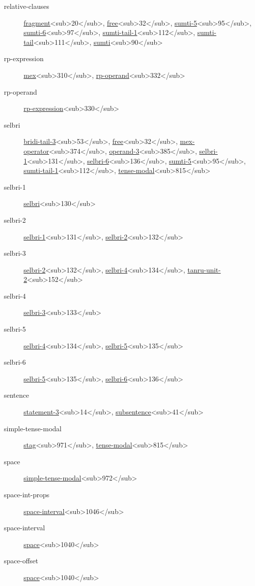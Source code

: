 \begin{description}
\item[relative-clauses] \hyperref[html:b20]{fragment}<sub>20</sub>, \hyperref[html:b32]{free}<sub>32</sub>, \hyperref[html:b95]{sumti-5}<sub>95</sub>, \hyperref[html:b97]{sumti-6}<sub>97</sub>, \hyperref[html:b112]{sumti-tail-1}<sub>112</sub>, \hyperref[html:b111]{sumti-tail}<sub>111</sub>, \hyperref[html:b90]{sumti}<sub>90</sub>
\item[rp-expression] \hyperref[html:b310]{mex}<sub>310</sub>, \hyperref[html:b332]{rp-operand}<sub>332</sub>
\item[rp-operand] \hyperref[html:b330]{rp-expression}<sub>330</sub>
\item[selbri] \hyperref[html:b53]{bridi-tail-3}<sub>53</sub>, \hyperref[html:b32]{free}<sub>32</sub>, \hyperref[html:b374]{mex-operator}<sub>374</sub>, \hyperref[html:b385]{operand-3}<sub>385</sub>, \hyperref[html:b131]{selbri-1}<sub>131</sub>, \hyperref[html:b136]{selbri-6}<sub>136</sub>, \hyperref[html:b95]{sumti-5}<sub>95</sub>, \hyperref[html:b112]{sumti-tail-1}<sub>112</sub>, \hyperref[html:b815]{tense-modal}<sub>815</sub>
\item[selbri-1] \hyperref[html:b130]{selbri}<sub>130</sub>
\item[selbri-2] \hyperref[html:b131]{selbri-1}<sub>131</sub>, \hyperref[html:b132]{selbri-2}<sub>132</sub>
\item[selbri-3] \hyperref[html:b132]{selbri-2}<sub>132</sub>, \hyperref[html:b134]{selbri-4}<sub>134</sub>, \hyperref[html:b152]{tanru-unit-2}<sub>152</sub>
\item[selbri-4] \hyperref[html:b133]{selbri-3}<sub>133</sub>
\item[selbri-5] \hyperref[html:b134]{selbri-4}<sub>134</sub>, \hyperref[html:b135]{selbri-5}<sub>135</sub>
\item[selbri-6] \hyperref[html:b135]{selbri-5}<sub>135</sub>, \hyperref[html:b136]{selbri-6}<sub>136</sub>
\item[sentence] \hyperref[html:b14]{statement-3}<sub>14</sub>, \hyperref[html:b41]{subsentence}<sub>41</sub>
\item[simple-tense-modal] \hyperref[html:b971]{stag}<sub>971</sub>, \hyperref[html:b815]{tense-modal}<sub>815</sub>
\item[space] \hyperref[html:b972]{simple-tense-modal}<sub>972</sub>
\item[space-int-props] \hyperref[html:b1046]{space-interval}<sub>1046</sub>
\item[space-interval] \hyperref[html:b1040]{space}<sub>1040</sub>
\item[space-offset] \hyperref[html:b1040]{space}<sub>1040</sub>

\end{description}
